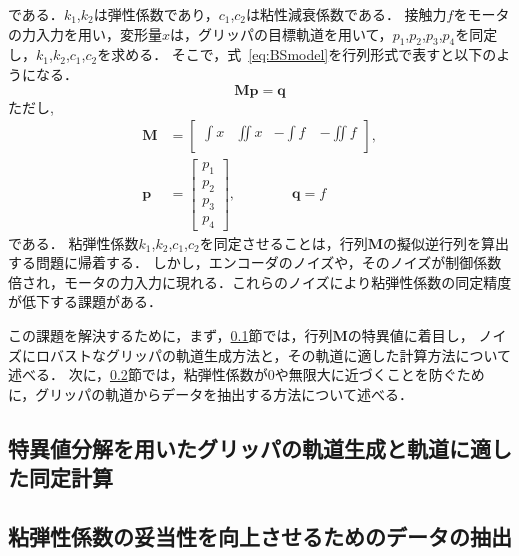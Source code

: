 \documentclass[a4paper]{jarticle}
\begin{document}
である．$k_1$,$k_2$は弾性係数であり，$c_1$,$c_2$は粘性減衰係数である．
接触力$f$をモータの力入力を用い，変形量$x$は，グリッパの目標軌道を用いて，$p_1$,$p_2$,$p_3$,$p_4$を同定し，$k_1$,$k_2$,$c_1$,$c_2$を求める．
そこで，式~\eqref{eq:BSmodel}を行列形式で表すと以下のようになる．
\begin{equation}
    \mathbf{M}\mathbf{p} = \mathbf{q} 
\end{equation}
ただし,
\begin{equation}
    \begin{aligned}
        \mathbf{M} &= \begin{bmatrix}
            \int{x} & \iint{x} & -\int{f}\ & -\iint{f}\\
        \end{bmatrix}, \\
        \mathbf{p}  &= \begin{bmatrix}
            p_1 \\
            p_2 \\
            p_3 \\
            p_4
        \end{bmatrix}, \quad\quad\quad\quad
        \mathbf{q}   = f
    \end{aligned}
\end{equation}
である．
粘弾性係数$k_1$,$k_2$,$c_1$,$c_2$を同定させることは，行列$\mathbf{M}$の擬似逆行列を算出する問題に帰着する．
しかし，エンコーダのノイズや，そのノイズが制御係数倍され，モータの力入力に現れる．これらのノイズにより粘弾性係数の同定精度が低下する課題がある．


この課題を解決するために，まず，\ref{subsec:QR_traj_and_calculation}節では，行列$\mathbf{M}$の特異値に着目し，
ノイズにロバストなグリッパの軌道生成方法と，その軌道に適した計算方法について述べる．
次に，\ref{subsec:downsample}節では，粘弾性係数が0や無限大に近づくことを防ぐために，グリッパの軌道からデータを抽出する方法について述べる．
\subsection{特異値分解を用いたグリッパの軌道生成と軌道に適した同定計算}\label{subsec:QR_traj_and_calculation}
\subsection{粘弾性係数の妥当性を向上させるためのデータの抽出}\label{subsec:downsample}
\end{document}

